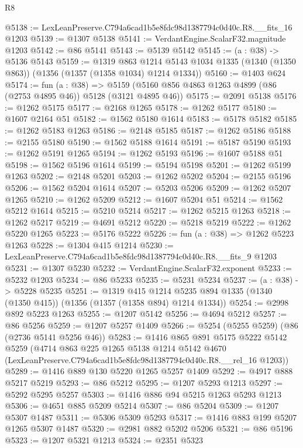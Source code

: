 \begin{lexlean}{R8}
\begin{coremodule}
@5138 := LexLeanPreserve.C794a6cad1b5e8fdc98d1387794c0d40c.R8.__fits_16 @1203
@5139 := @1307 @5138
@5141 := VerdantEngine.ScalarF32.magnitude @1203
@5142 := @86 @5141
@5143 := @5139 @5142
@5145 := (a : @38) -> @5136 @5143
@5159 := @1319
    @863
    @1214
    @5143
    @1034
    @1335
    (@1340 (@1350 @863))
    (@1356 (@1357 (@1358 @1034) @1214 @1334))
@5160 := @1403 @624
@5174 := fun (a : @38) =>
  @5159 (@5160 @856 @4863 @1263 @4899 (@86 (@2753 @4895 @46)) @5128 (@3121 @4895 @46))
@5175 := @2091 @5138
@5176 := @1262 @5175
@5177 := @2168 @1265
@5178 := @1262 @5177
@5180 := @1607 @2164 @51
@5182 := @1562 @5180 @1614
@5183 := @5178 @5182
@5185 := @1262 @5183 @1263
@5186 := @2148 @5185
@5187 := @1262 @5186
@5188 := @2155 @5180
@5190 := @1562 @5188 @1614
@5191 := @5187 @5190
@5193 := @1262 @5191 @1265
@5194 := @1262 @5193
@5196 := @1607 @5188 @51
@5198 := @1562 @5196 @1614
@5199 := @5194 @5198
@5201 := @1262 @5199 @1263
@5202 := @2148 @5201
@5203 := @1262 @5202
@5204 := @2155 @5196
@5206 := @1562 @5204 @1614
@5207 := @5203 @5206
@5209 := @1262 @5207 @1265
@5210 := @1262 @5209
@5212 := @1607 @5204 @51
@5214 := @1562 @5212 @1614
@5215 := @5210 @5214
@5217 := @1262 @5215 @1263
@5218 := @1262 @5217
@5219 := @4691 @5212
@5220 := @5218 @5219
@5222 := @1262 @5220 @1265
@5223 := @5176 @5222
@5226 := fun (a : @38) => @1262 @5223 @1263
@5228 := @1304 @415 @1214
@5230 := LexLeanPreserve.C794a6cad1b5e8fdc98d1387794c0d40c.R8.__fits_9 @1203
@5231 := @1307 @5230
@5232 := VerdantEngine.ScalarF32.exponent
@5233 := @5232 @1203
@5234 := @86 @5233
@5235 := @5231 @5234
@5237 := (a : @38) -> @5228 @5235
@5251 := @1319
    @415
    @1214
    @5235
    @894
    @1335
    (@1340 (@1350 @415))
    (@1356 (@1357 (@1358 @894) @1214 @1334))
@5254 := @2998 @892 @5223 @1263
@5255 := @1207 @5142
@5256 := @4694 @5212
@5257 := @86 @5256
@5259 := @1207 @5257 @1409
@5266 := @5254 (@5255 @5259) (@86 (@2736 @5141 @5256 @46))
@5283 := @1416
    @865
    @891
    @5175
    @5222
    @5142
    @5259
    (@4714
      @863
      @225
      @1265
      @5138
      @1214
      @5142
      @4670
      (LexLeanPreserve.C794a6cad1b5e8fdc98d1387794c0d40c.R8.__rel_16 @1203))
@5289 := @1416 @889 @130 @5220 @1265 @5257 @1409
@5292 := @4917 @888 @5217 @5219
@5293 := @86 @5212
@5295 := @1207 @5293 @1213
@5297 := @5292 @5295 @5257
@5303 := @1416 @886 @94 @5215 @1263 @5293 @1213
@5306 := @4651 @885 @5209 @5214
@5307 := @86 @5204
@5309 := @1207 @5307 @1487
@5311 := @5306 @5309 @5293
@5317 := @1416 @883 @199 @5207 @1265 @5307 @1487
@5320 := @2981 @882 @5202 @5206
@5321 := @86 @5196
@5323 := @1207 @5321 @1213
@5324 := @2351 @5323

\end{coremodule}
\end{lexlean}
